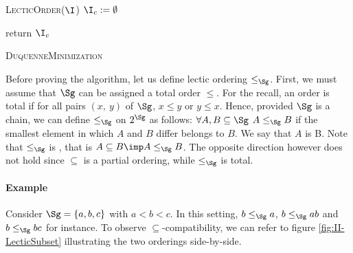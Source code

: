\begin{algorithm}
	
	\BlankLine
	\BlankLine
	

	\BlankLine
	
	\textsc{LecticOrder}($\I$) \;
	$\I_c := \emptyset$ \;
	
	\BlankLine
	

	\BlankLine
	
	return $\I_c$ \;
	
	\caption{\textsc{DuquenneMinimization}}
	\label{alg:Duquenne-min}
\end{algorithm}

Before proving the algorithm, let us define lectic ordering $\leq_{\Sg}$. First, we must assume that $\Sg$ can be assigned a total order $\leq$. For the recall, an order is total if for all pairs $(x, \ y)$ of $\Sg$, $x \leq y$ or $y \leq x$. Hence, provided $\Sg$ is a chain, we can define $\leq_{\Sg}$ on
$2^{\Sg}$ as follows: $\forall A, B \subseteq \Sg$ $A \leq_{\Sg} B$ if the
smallest element in which $A$ and $B$ differ belongs to $B$. We say that $A$ is  B. Note that $\leq_{\Sg}$ is , that is $A \subseteq B \imp A \leq_{\Sg} B$.
The opposite direction however does not hold since $\subseteq$ is a partial 
ordering, while $\leq_{\Sg}$ is total. 

\paragraph{Example} Consider $\Sg = \{ a, b, c \}$ with $a < b < c$. In
this setting, $b \leq_{\Sg} a$, $b \leq_{\Sg} ab$ and $b \leq_{\Sg} bc$ for instance. To observe $\subseteq$-compatibility, we can refer to figure \ref{fig:II-LecticSubset} illustrating the two orderings side-by-side. 

